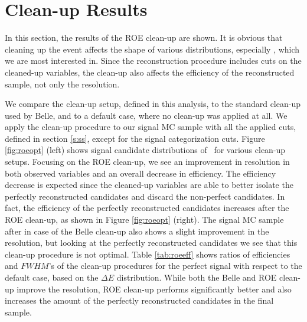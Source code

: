
\section{Clean-up Results}

In this section, the results of the ROE clean-up are shown. It is obvious that cleaning up the event affects the shape of various distributions, especially \vars, which we are most interested in. Since the reconstruction procedure includes cuts on the cleaned-up variables, the clean-up also affects the efficiency of the reconstructed sample, not only the resolution. 

We compare the clean-up setup, defined in this analysis, to the standard clean-up used by Belle, and to a default case, where no clean-up was applied at all. We apply the clean-up procedure to our signal MC sample with all the applied cuts, defined in section \ref{s:ss}, except for the signal categorization cuts. Figure \ref{fig:roeopt} (left) shows signal candidate distributions of \vars~for various clean-up setups. Focusing on the ROE clean-up, we see an improvement in resolution in both observed variables and an overall decrease in efficiency. The efficiency decrease is expected since the cleaned-up variables are able to better isolate the perfectly reconstructed candidates and discard the non-perfect candidates. In fact, the efficiency of the perfectly reconstructed candidates increases after the ROE clean-up, as shown in Figure \ref{fig:roeopt} (right). The signal MC sample after in case of the Belle clean-up also shows a slight improvement in the resolution, but looking at the perfectly reconstructed candidates we see that this clean-up procedure is not optimal. Table \ref{tab:roeeff} shows ratios of efficiencies and $FWHM$'s of the clean-up procedures for the perfect signal with respect to the default case, based on the $\Delta E$ distribution. While both the Belle and ROE clean-up improve the resolution, ROE clean-up performs significantly better and also increases the amount of the perfectly reconstructed candidates in the final sample.

